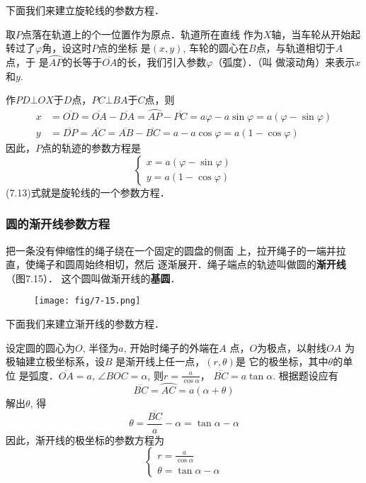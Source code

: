 下面我们来建立旋轮线的参数方程．

取$P$点落在轨道上的个一位置作为原点．轨道所在直线
作为$X$轴，当车轮从开始起转过了$\varphi$角，设这时$P$点的坐标
是$(x,y)$, 车轮的圆心在$B$点，与轨道相切于$A$点，于
是$\wideparen{AP}$的长等于$\overline{OA}$的长，我们引入参数$\varphi$（弧度）．（叫
做滚动角）来表示$x$和$y$.

作$PD\bot OX$于$D$点，$PC\bot BA$于$C$点，则
\[\begin{split}
    x&=\overline{OD}=\overline{OA}-\overline{DA}=\wideparen{AP}-\overline{PC}=a\varphi-a\sin\varphi=a(\varphi-\sin\varphi)\\
    y&=\overline{DP}=\overline{AC}=\overline{AB}-\overline{BC}=a -a\cos\varphi=a(1-\cos\varphi)
\end{split}\]
因此，$P$点的轨迹的参数方程是
\begin{equation}
    \begin{cases}
        x=a(\varphi-\sin\varphi)\\
        y=a(1-\cos\varphi)
    \end{cases}
\end{equation}
(7.13)式就是旋轮线的一个参数方程．

\subsubsection{圆的渐开线参数方程}

把一条没有伸缩性的绳子绕在一个固定的圆盘的侧面
上，拉开绳子的一端并拉直，使绳子和圆周始终相切，然后
逐渐展开．绳子端点的轨迹叫做圆的\textbf{渐开线}（图7.15）．
这个圆叫做渐开线的\textbf{基圆}．
\begin{figure}[htp]
    \centering
\texttt{[image: fig/7-15.png]}
    \caption{}
\end{figure}

下面我们来建立渐开线的参数方程．

设定圆的圆心为$O$, 半径为$a$, 开始时绳子的外端在$A$
点，$O$为极点，以射线$OA$
为极轴建立极坐标系，设$B$
是渐开线上任一点，$(r,\theta)$是
它的极坐标，其中$\theta$的单位
是弧度．$\overline{OA}=a$, 
$\angle BOC=\alpha$, 则$r=\frac{a}{\cos\alpha}$，
$\overline{BC}=a\tan\alpha$. 根据题设应有
\[\overline{BC}=\wideparen{AC}=a(\alpha+\theta)\]
解出$\theta$, 得
\[\theta=\frac{\overline{BC}}{a}-\alpha=\tan\alpha-\alpha\]
因此，渐开线的极坐标的参数方程为
\begin{equation}
    \begin{cases}
        r=\frac{a}{\cos\alpha}\\
    \theta=\tan\alpha-\alpha
    \end{cases}
\end{equation}

